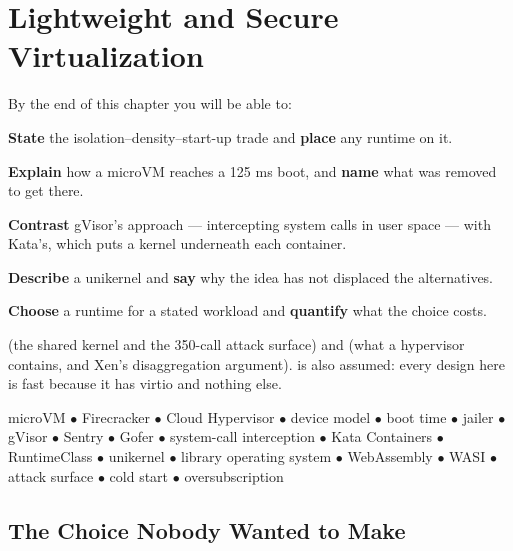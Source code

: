 \chapter{Lightweight and Secure Virtualization}\label{ch:lightweight}

\begin{outcomes}
By the end of this chapter you will be able to:
\begin{tight}
  \item \textbf{State} the isolation--density--start-up trade and \textbf{place}
        any runtime on it.
  \item \textbf{Explain} how a microVM reaches a 125 ms boot, and \textbf{name}
        what was removed to get there.
  \item \textbf{Contrast} gVisor's approach --- intercepting system calls in
        user space --- with Kata's, which puts a kernel underneath each
        container.
  \item \textbf{Describe} a unikernel and \textbf{say} why the idea has not
        displaced the alternatives.
  \item \textbf{Choose} a runtime for a stated workload and \textbf{quantify}
        what the choice costs.
\end{tight}
\end{outcomes}

\begin{prereq}
 (the shared kernel and the 350-call attack surface) and
 (what a hypervisor contains, and Xen's disaggregation
argument).  is also assumed: every design here is fast because
it has virtio and nothing else.
\end{prereq}

\begin{keyterms}
microVM $\bullet$ Firecracker $\bullet$ Cloud Hypervisor $\bullet$ device model
$\bullet$ boot time $\bullet$ jailer $\bullet$ gVisor $\bullet$ Sentry $\bullet$
Gofer $\bullet$ system-call interception $\bullet$ Kata Containers $\bullet$
RuntimeClass $\bullet$ unikernel $\bullet$ library operating system $\bullet$
WebAssembly $\bullet$ WASI $\bullet$ attack surface $\bullet$ cold start
$\bullet$ oversubscription
\end{keyterms}

\section{The Choice Nobody Wanted to Make}

